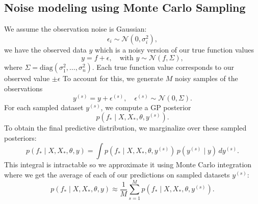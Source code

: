 \documentclass{ucdgradtaughtthesis}
\begin{document}
\subsection{Noise modeling using Monte Carlo Sampling}
\label{appendix:monte_carlo}

We assume the observation noise is Gaussian:
\[
\epsilon_i \sim \mathcal{N}(0, \sigma_i^2),
\]
we have the observed data \( y \) which is a noisy version of our true function values
\[
y = f + \epsilon, \quad \text{with } y \sim \mathcal{N}(f, \Sigma),
\]
where \( \Sigma = \mathrm{diag}(\sigma_1^2, \dots, \sigma_n^2) \).
Each true function value corresponds to our observed value \(\pm \epsilon\)
To account for this, we generate \( M \) noisy samples of the observations
\begin{equation}
    y^{(s)} = y + \epsilon^{(s)}, \quad \epsilon^{(s)} \sim \mathcal{N}(0, \Sigma).
\end{equation}
For each sampled dataset \( y^{(s)} \), we compute a GP posterior
\begin{equation}
    p(f_* \mid X, X_*, \theta, y^{(s)}).
\end{equation}
To obtain the final predictive distribution, we marginalize over these sampled posteriors:
\begin{equation}
    p(f_* \mid X, X_*, \theta, y) = \int p(f_* \mid X, X_*, \theta, y^{(s)}) \, p(y^{(s)} \mid y) \, dy^{(s)}.
\end{equation}
This integral is intractable so we approximate it using Monte Carlo integration where we get the average of each of our predictions on sampled datasets \(y^{(s)}\):
\begin{equation}
    p(f_* \mid X, X_*, \theta, y) \approx \frac{1}{M} \sum_{s=1}^{M} p(f_* \mid X, X_*, \theta, y^{(s)}).
\end{equation}

% 
% 
\end{document}

